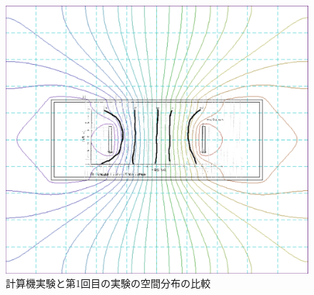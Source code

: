 \begin{figure}[H]
    \begin{center}
        \includegraphics[scale=0.5]{figure5.pdf}
        \caption{計算機実験と第1回目の実験の空間分布の比較}
    \end{center}
\end{figure}